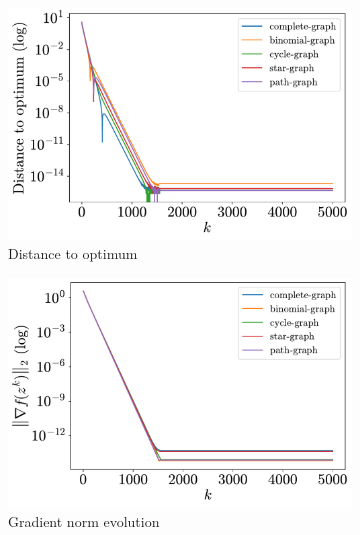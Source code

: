 \documentclass[a4paper,11pt,oneside]{book}
\begin{document}
\begin{figure}[H]
      \centering
      \begin{subfigure}[t]{0.46\linewidth}
            \centering
            \includegraphics[width=\linewidth]{./figs/quadratic/5_3/distance.pdf} 
            \caption{Distance to optimum}
      \end{subfigure}
      \hfill
      \begin{subfigure}[t]{0.46\linewidth}
            \centering
            \includegraphics[width=\linewidth]{./figs/quadratic/5_3/gradient.pdf} 
            \caption{Gradient norm evolution}
      \end{subfigure}
      \hfill
      \begin{subfigure}[t]{0.46\linewidth}
            \centering

\end{subfigure}
\end{figure}
\end{document}
